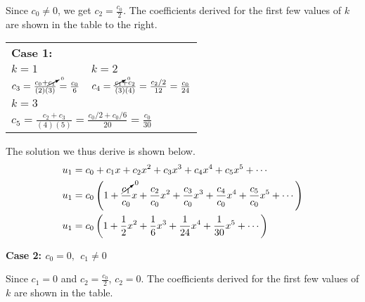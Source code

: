 \noindent Since $c_0 \ne 0$, we get $c_2 = \frac{c_0}{2}$. The coefficients derived for the first few values of $k$ are shown in the table to the right.
\begin{margintable}
\begin{tabular}{l|l}
\multicolumn{2}{l}{\textbf{Case 1:}} \\
$k=1$ & $k=2$ \\
$c_3 = \frac{c_0 + \cancelto{0}{c_1}}{(2)(3)} = \frac{c_0}{6}$ & $c_4 = \frac{\cancelto{0}{c_1}+c_2}{(3)(4)} = \frac{c_2/2}{12} = \frac{c_0}{24}$\\\hline
\multicolumn{2}{l}{$k=3$} \\
\multicolumn{2}{l}{$c_5 = \frac{c_2 + c_3}{(4)(5)} = \frac{c_0/2 + c_0/6}{20} = \frac{c_0}{30}$} \\
\end{tabular}
\end{margintable}
The solution we thus derive is shown below.
\begin{align*}
u_1 &= c_0 + c_1x + c_2x^2 + c_3x^3 + c_4x^4 + c_5x^5 + \cdots \\
u_1 &= c_0\left(1 + \frac{\cancelto{0}{c_1}}{c_0}x + \frac{c_2}{c_0}x^2 + \frac{c_3}{c_0}x^3 + \frac{c_4}{c_0}x^4 + \frac{c_5}{c_0}x^5 + \cdots \right) \\
u_1 &= c_0\left(1 + \frac{1}{2}x^2 + \frac{1}{6}x^3 + \frac{1}{24}x^4 + \frac{1}{30}x^5 + \cdots \right)
\end{align*}

\vspace{1.0cm}

\noindent\textbf{Case 2: $c_0 = 0, \ \ c_1 \ne 0$}

Since $c_1 = 0$ and $c_2 = \frac{c_0}{2}$, $c_2 = 0$.  The coefficients derived for the first few values of $k$ are shown in the table.

